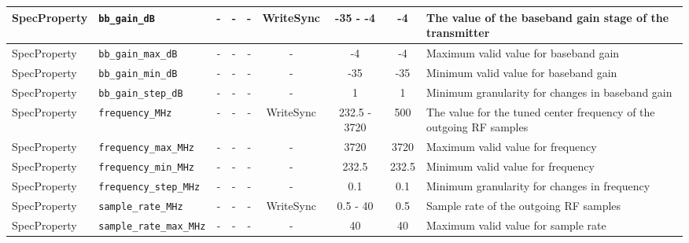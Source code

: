 \documentclass{article}
\begin{document}
\begin{landscape}
\begin{scriptsize}
\begin{tabular}{|p{2cm}|p{4cm}|c|c|c|c|c|c|p{6.5cm}|}
			\hline
			SpecProperty & \verb+bb_gain_dB+                   & -    & -        & -          & WriteSync      & -35 - -4     & -4      & The value of the baseband gain stage of the transmitter                                       \\
			\hline
			SpecProperty & \verb+bb_gain_max_dB+               & -    & -        & -          & -              & -4           & -4      & Maximum valid value for baseband gain                                                         \\
			\hline
			SpecProperty & \verb+bb_gain_min_dB+               & -    & -        & -          & -              & -35          & -35     & Minimum valid value for baseband gain                                                         \\
			\hline
			SpecProperty & \verb+bb_gain_step_dB+              & -    & -        & -          & -              & 1            & 1       & Minimum granularity for changes in baseband gain                                              \\
			\hline
			SpecProperty & \verb+frequency_MHz+                & -    & -        & -          & WriteSync      & 232.5 - 3720 & 500     & The value for the tuned center frequency of the outgoing RF samples                           \\
			\hline
			SpecProperty & \verb+frequency_max_MHz+            & -    & -        & -          & -              & 3720         & 3720    & Maximum valid value for frequency                                                             \\
			\hline
			SpecProperty & \verb+frequency_min_MHz+            & -    & -        & -          & -              & 232.5        & 232.5   & Minimum valid value for frequency                                                             \\
			\hline
			SpecProperty & \verb+frequency_step_MHz+           & -    & -        & -          & -              & 0.1          & 0.1     & Minimum granularity for changes in frequency                                                  \\
			\hline
			SpecProperty & \verb+sample_rate_MHz+              & -    & -        & -          & WriteSync      & 0.5 - 40     & 0.5     & Sample rate of the outgoing RF samples                                                        \\
			\hline
			SpecProperty & \verb+sample_rate_max_MHz+          & -    & -        & -          & -              & 40           & 40      & Maximum valid value for sample rate                                                           \\

\end{tabular}
\end{scriptsize}
\end{landscape}
\end{document}
